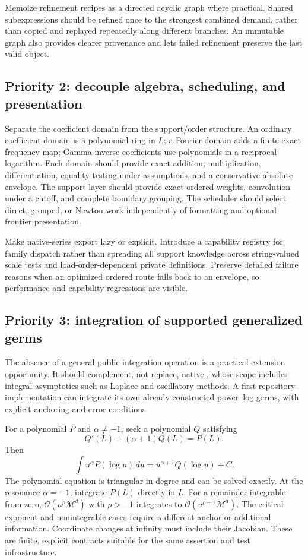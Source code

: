 \documentclass[11pt,letterpaper]{article}
\newcommand{\code}[1]{\texttt{\small\detokenize{#1}}}
\newcommand{\OO}{\mathcal O}
\newcommand{\M}{\mathcal M}
\begin{document}
Memoize refinement recipes as a directed acyclic graph where practical. Shared subexpressions should be refined once to the strongest combined demand, rather than copied and replayed repeatedly along different branches. An immutable graph also provides clearer provenance and lets failed refinement preserve the last valid object.

\subsection{Priority 2: decouple algebra, scheduling, and presentation}
Separate the coefficient domain from the support/order structure. An ordinary coefficient domain is a polynomial ring in $L$; a Fourier domain adds a finite exact frequency map; Gamma inverse coefficients use polynomials in a reciprocal logarithm. Each domain should provide exact addition, multiplication, differentiation, equality testing under assumptions, and a conservative absolute envelope. The support layer should provide exact ordered weights, convolution under a cutoff, and complete boundary grouping. The scheduler should select direct, grouped, or Newton work independently of formatting and optional frontier presentation.

Make native-series export lazy or explicit. Introduce a capability registry for family dispatch rather than spreading all support knowledge across string-valued scale tests and load-order-dependent private definitions. Preserve detailed failure reasons when an optimized ordered route falls back to an envelope, so performance and capability regressions are visible.

\subsection{Priority 3: integration of supported generalized germs}
The absence of a general public integration operation is a practical extension opportunity. It should complement, not replace, native \code{AsymptoticIntegrate}, whose scope includes integral asymptotics such as Laplace and oscillatory methods. A first repository implementation can integrate its own already-constructed power--log germs, with explicit anchoring and error conditions.\cite{wl-integrate,repo-guide}

For a polynomial $P$ and $\alpha\ne-1$, seek a polynomial $Q$ satisfying
\[
 Q'(L)+(\alpha+1)Q(L)=P(L).
\]
Then
\[
 \int u^\alpha P(\log u)\,du=u^{\alpha+1}Q(\log u)+C.
\]
The polynomial equation is triangular in degree and can be solved exactly. At the resonance $\alpha=-1$, integrate $P(L)$ directly in $L$. For a remainder integrable from zero, $\OO(u^\rho\M^d)$ with $\rho>-1$ integrates to $\OO(u^{\rho+1}\M^d)$. The critical exponent and nonintegrable cases require a different anchor or additional information. Coordinate changes at infinity must include their Jacobian. These are finite, explicit contracts suitable for the same assertion and test infrastructure.
\end{document}
